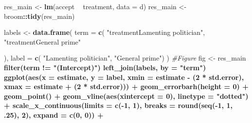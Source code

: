 \documentclass[]{book}
\newenvironment{Shaded}{\begin{snugshade}}{\end{snugshade}}
\newcommand{\KeywordTok}[1]{\textcolor[rgb]{0.13,0.29,0.53}{\textbf{#1}}}
\newcommand{\DataTypeTok}[1]{\textcolor[rgb]{0.13,0.29,0.53}{#1}}
\newcommand{\DecValTok}[1]{\textcolor[rgb]{0.00,0.00,0.81}{#1}}
\newcommand{\StringTok}[1]{\textcolor[rgb]{0.31,0.60,0.02}{#1}}
\newcommand{\CommentTok}[1]{\textcolor[rgb]{0.56,0.35,0.01}{\textit{#1}}}
\newcommand{\OperatorTok}[1]{\textcolor[rgb]{0.81,0.36,0.00}{\textbf{#1}}}
\newcommand{\NormalTok}[1]{#1}
\begin{document}
\begin{Shaded}
\begin{Highlighting}[]
\NormalTok{res_main <-}\StringTok{  }\KeywordTok{lm}\NormalTok{(accept }\OperatorTok{~}\StringTok{ }\NormalTok{treatment, }\DataTypeTok{data =}\NormalTok{ d) }
\NormalTok{res_main <-}\StringTok{ }\NormalTok{broom}\OperatorTok{::}\KeywordTok{tidy}\NormalTok{(res_main)}

\NormalTok{labels <-}\StringTok{ }\KeywordTok{data.frame}\NormalTok{(}
  \DataTypeTok{term =} \KeywordTok{c}\NormalTok{(}
    \StringTok{"treatmentLamenting politician"}\NormalTok{,}
    \StringTok{"treatmentGeneral prime"}
    
\NormalTok{  ),}
  \DataTypeTok{label =} \KeywordTok{c}\NormalTok{( }\StringTok{"Lamenting politician"}\NormalTok{,}
             \StringTok{"General prime"}\NormalTok{)}
\NormalTok{)}
\CommentTok{#Figure}
\NormalTok{fig <-}\StringTok{   }\NormalTok{res_main }\OperatorTok{%>%}
\StringTok{  }\KeywordTok{filter}\NormalTok{(term }\OperatorTok{!=}\StringTok{ "(Intercept)"}\NormalTok{) }\OperatorTok{%>%}\StringTok{ }
\StringTok{  }\KeywordTok{left_join}\NormalTok{(labels, }\DataTypeTok{by =} \StringTok{"term"}\NormalTok{) }\OperatorTok{%>%}\StringTok{ }
\StringTok{  }
\StringTok{  }\KeywordTok{ggplot}\NormalTok{(}\KeywordTok{aes}\NormalTok{(}\DataTypeTok{x =}\NormalTok{ estimate, }\DataTypeTok{y =}\NormalTok{ label,}
             \DataTypeTok{xmin =}\NormalTok{ estimate }\OperatorTok{-}\StringTok{ }\NormalTok{(}\DecValTok{2} \OperatorTok{*}\StringTok{ }\NormalTok{std.error),}
             \DataTypeTok{xmax =}\NormalTok{ estimate }\OperatorTok{+}\StringTok{ }\NormalTok{(}\DecValTok{2} \OperatorTok{*}\StringTok{ }\NormalTok{std.error))) }\OperatorTok{+}
\StringTok{   }\KeywordTok{geom_errorbarh}\NormalTok{(}\DataTypeTok{height =} \DecValTok{0}\NormalTok{) }\OperatorTok{+}
\StringTok{  }\KeywordTok{geom_point}\NormalTok{() }\OperatorTok{+}
\StringTok{  }\KeywordTok{geom_vline}\NormalTok{(}\KeywordTok{aes}\NormalTok{(}\DataTypeTok{xintercept =} \DecValTok{0}\NormalTok{), }\DataTypeTok{linetype =} \StringTok{"dotted"}\NormalTok{) }\OperatorTok{+}
\StringTok{  }\KeywordTok{scale_x_continuous}\NormalTok{(}\DataTypeTok{limits =} \KeywordTok{c}\NormalTok{(}\OperatorTok{-}\DecValTok{1}\NormalTok{, }\DecValTok{1}\NormalTok{),}
                     \DataTypeTok{breaks =} \KeywordTok{round}\NormalTok{(}\KeywordTok{seq}\NormalTok{(}\OperatorTok{-}\DecValTok{1}\NormalTok{, }\DecValTok{1}\NormalTok{, .}\DecValTok{25}\NormalTok{), }\DecValTok{2}\NormalTok{),}
                     \DataTypeTok{expand =} \KeywordTok{c}\NormalTok{(}\DecValTok{0}\NormalTok{, }\DecValTok{0}\NormalTok{)) }\OperatorTok{+}
}}}
\end{Highlighting}
\end{Shaded}
\end{document}
